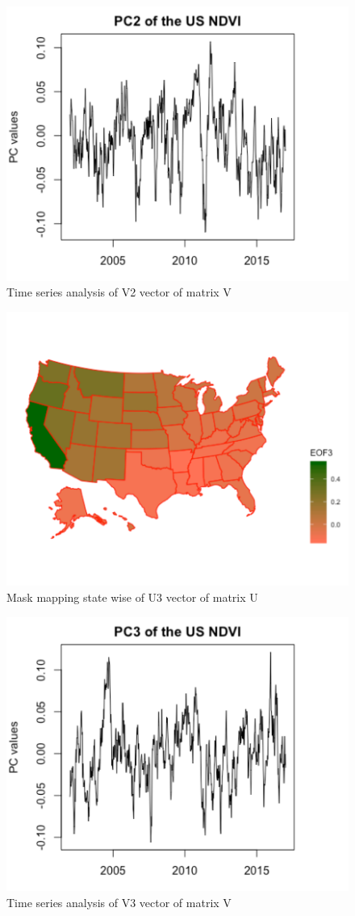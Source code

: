     \begin{figure}[H]
            \centering
            \includegraphics[width=0.70\linewidth]{figures/ch5/SVD/pc2.png}
            \caption{\label{fig:V_2} Time series analysis of V2 vector of matrix V}
    \end{figure}
    
     \begin{figure}[H]
            \centering
            \includegraphics[width=0.70\linewidth]{figures/ch5/SVD/eof3.png}
            \caption{\label{fig:EOF_3} Mask mapping state wise of U3 vector of matrix U}
    \end{figure}
    
     \begin{figure}[H]
            \centering
            \includegraphics[width=0.70\linewidth]{figures/ch5/SVD/pc3.png}
            \caption{\label{fig:V_3} Time series analysis of V3 vector of matrix V}
    \end{figure}
    
